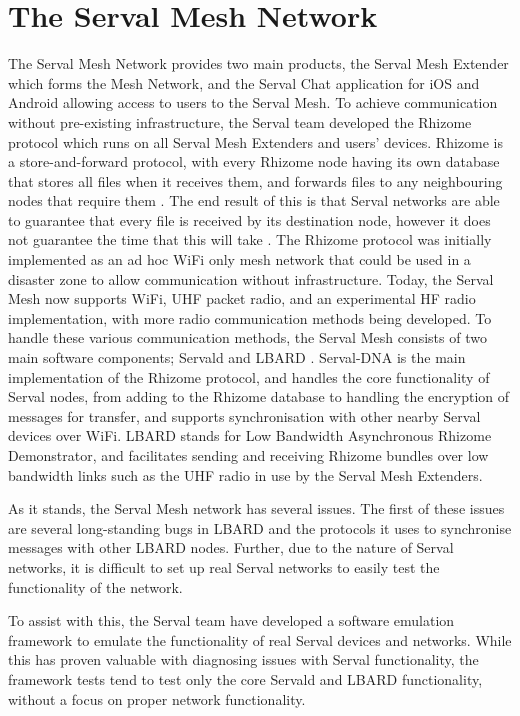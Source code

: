 \section{The Serval Mesh Network}
The Serval Mesh Network provides two main products, the Serval Mesh Extender which forms the Mesh Network, and the Serval Chat application for iOS and Android allowing access to users to the Serval Mesh.
To achieve communication without pre-existing infrastructure, the Serval team developed the Rhizome protocol which runs on all Serval Mesh Extenders and users' devices.
Rhizome is a store-and-forward protocol, with every Rhizome node having its own database that stores all files when it receives them, and forwards files to any neighbouring nodes that require them \parencite{productizingServalMesh}.
The end result of this is that Serval networks are able to guarantee that every file is received by its destination node, however it does not guarantee the time that this will take \parencite{rhizomeDocumentation}.
The Rhizome protocol was initially implemented as an ad hoc WiFi only mesh network that could be used in a disaster zone to allow communication without infrastructure.
Today, the Serval Mesh now supports WiFi, UHF packet radio, and an experimental HF radio implementation, with more radio communication methods being developed.
To handle these various communication methods, the Serval Mesh consists of two main software components; Servald and LBARD \parencite{productizingServalMesh}.
Serval-DNA is the main implementation of the Rhizome protocol, and handles the core functionality of Serval nodes, from adding to the Rhizome database to handling the encryption of messages for transfer, and supports synchronisation with other nearby Serval devices over WiFi.
LBARD stands for Low Bandwidth Asynchronous Rhizome Demonstrator, and facilitates sending and receiving Rhizome bundles over low bandwidth links such as the UHF radio in use by the Serval Mesh Extenders.

As it stands, the Serval Mesh network has several issues.
The first of these issues are several long-standing bugs in LBARD and the protocols it uses to synchronise messages with other LBARD nodes.
Further, due to the nature of Serval networks, it is difficult to set up real Serval networks to easily test the functionality of the network.

To assist with this, the Serval team have developed a software emulation framework to emulate the functionality of real Serval devices and networks.
While this has proven valuable with diagnosing issues with Serval functionality, the framework tests tend to test only the core Servald and LBARD functionality, without a focus on proper network functionality.

